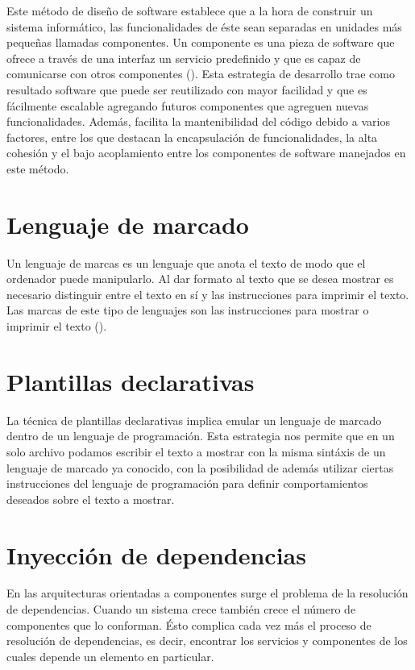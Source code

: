 Este método de diseño de software establece que a la hora de construir un sistema
informático, las funcionalidades de éste sean separadas en unidades más pequeñas
llamadas componentes. Un componente es una pieza de software que ofrece a través
de una interfaz un servicio predefinido y que es capaz de comunicarse con otros
componentes (\cite{COMPONENT}). Esta estrategia de desarrollo trae como resultado
software que puede ser reutilizado con mayor facilidad y que es fácilmente escalable
agregando futuros componentes que agreguen nuevas funcionalidades. Además, facilita la
mantenibilidad del código debido a varios factores, entre los que destacan la encapsulación
de funcionalidades, la alta cohesión y el bajo acoplamiento entre los componentes de
software manejados en este método.

\section{Lenguaje de marcado}

Un lenguaje de marcas es un lenguaje que anota el texto de modo que el ordenador puede manipularlo.
Al dar formato al texto que se desea mostrar es necesario distinguir entre el texto en sí
y las instrucciones para imprimir el texto. Las marcas de este tipo de lenguajes son las
instrucciones para mostrar o imprimir el texto (\cite{MARCADO}).

\section{Plantillas declarativas}

La técnica de plantillas declarativas implica emular un lenguaje de marcado dentro de un
lenguaje de programación. Esta estrategia nos permite que en un solo archivo podamos
escribir el texto a mostrar con la misma sintáxis de un lenguaje de marcado ya conocido,
con la posibilidad de además utilizar ciertas instrucciones del lenguaje de programación
para definir comportamientos deseados sobre el texto a mostrar.

\section{Inyección de dependencias}

En las arquitecturas orientadas a componentes surge el problema de la resolución de
dependencias. Cuando un sistema crece también crece el número de componentes que lo
conforman. Ésto complica cada vez más el proceso de resolución de dependencias, es decir,
encontrar los servicios y componentes de los cuales depende un elemento en particular.

